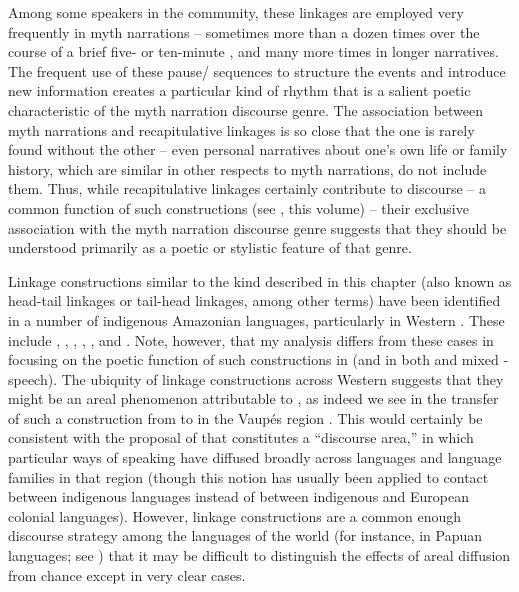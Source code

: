 \documentclass[output=paper]{LSP/langsci}
\begin{document}
Among some speakers in the community, these linkages are employed very frequently in myth narrations – sometimes more than a dozen times over the course of a brief five- or ten-minute , and many more times in longer narratives. The frequent use of these pause/ sequences to structure the events and introduce new information creates a particular kind of  rhythm that is a salient poetic characteristic of the myth narration discourse genre. The association between myth narrations and recapitulative linkages is so close that the one is rarely found without the other – even personal narratives about one’s own life or family history, which are similar in other respects to myth narrations, do not include them. Thus, while recapitulative linkages certainly contribute to discourse  – a common function of such constructions (see \citeauthor{guerin18}, this volume) – their exclusive association with the myth narration discourse genre suggests that they should be understood primarily as a poetic or stylistic feature of that genre.

Linkage constructions similar to the kind described in this chapter (also known as head-tail linkages or tail-head linkages, among other terms) have been identified in a number of indigenous Amazonian languages, particularly in Western . These include  \citep{Guillaume2011},  \citep[][169--171]{aikhenvald02},  \citep{vangijn14},  \citep{overall14},  \citep[][515--522]{kasia17}, and  \citep[][598--599]{vuill12}. Note, however, that my analysis differs from these cases in focusing on the poetic function of such constructions in  (and in both  and mixed - speech). The ubiquity of linkage constructions across Western  suggests that they might be an areal phenomenon attributable to  \citep[][916]{seifart10}, as indeed we see in the transfer of such a construction from  to  in the Vaupés region \citep[][169--171]{aikhenvald02}. This would certainly be consistent with the proposal of \citet{beieretal.2002} that  constitutes a ``discourse area,'' in which particular ways of speaking have diffused broadly across languages and language families in that region (though this notion has usually been applied to contact between indigenous languages instead of between indigenous and European colonial languages). However, linkage constructions are a common enough discourse strategy among the languages of the world (for instance, in Papuan languages; see \citealt{devries.2005}) that it may be difficult to distinguish the effects of areal diffusion from chance except in very clear cases.
\end{document}

